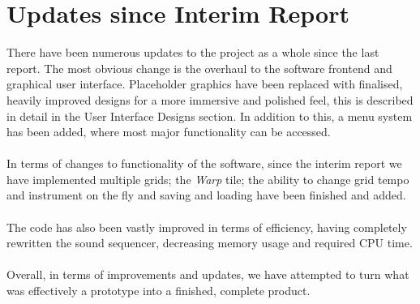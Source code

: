 \documentclass[10pt,a4paper]{article}
\begin{document}
\section{Updates since Interim Report}
There have been numerous updates to the project as a whole since the last report. The most obvious change is the overhaul to the software frontend and graphical user interface. Placeholder graphics have been replaced with finalised, heavily improved designs for a more immersive and polished feel, this is described in detail in the User Interface Designs section. In addition to this, a menu system has been added, where most major functionality can be accessed. \\
\\
In terms of changes to functionality of the software, since the interim report we have implemented multiple grids; the \textit{Warp} tile; the ability to change grid tempo and instrument on the fly and saving and loading have been finished and added.\\
\\
The code has also been vastly improved in terms of efficiency, having completely rewritten the sound sequencer, decreasing memory usage and required CPU time.\\
\\
Overall, in terms of improvements and updates, we have attempted to turn what was effectively a prototype into a finished, complete product.\\
\end{document}
